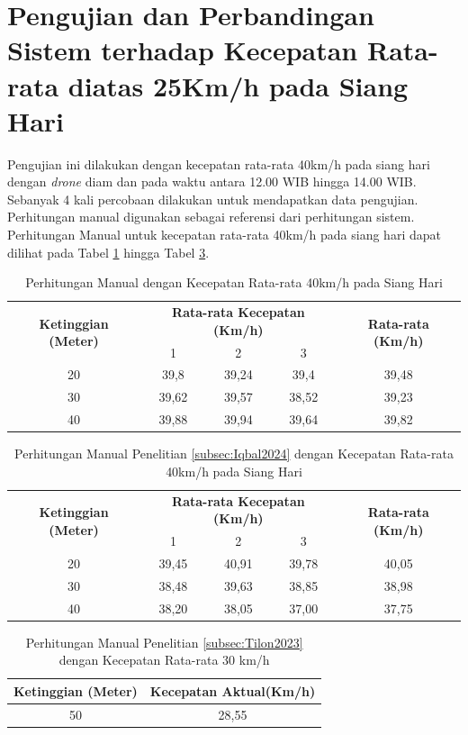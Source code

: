 \section{Pengujian dan Perbandingan Sistem terhadap Kecepatan Rata-rata diatas 25Km/h pada Siang Hari}
Pengujian ini dilakukan dengan kecepatan rata-rata 40km/h pada siang hari dengan \emph{drone} diam dan pada waktu antara 12.00 WIB hingga 14.00 WIB. Sebanyak 4 kali percobaan dilakukan untuk mendapatkan data pengujian. Perhitungan manual digunakan sebagai referensi dari perhitungan sistem. Perhitungan Manual untuk kecepatan rata-rata 40km/h pada siang hari dapat dilihat pada Tabel \ref{table:40km/h-siang-manual} hingga Tabel \ref{table:30kmh-manual-Tilon}.

\begin{table}[H]
	\caption{Perhitungan Manual dengan Kecepatan Rata-rata 40km/h pada Siang Hari}
    \label{table:40km/h-siang-manual}
	\centering
	\begin{tabular}{|c|c|c|c|c|}
		\hline
		\multirow{2}{*}{\textbf{Ketinggian (Meter)}} & \multicolumn{3}{c|}{\textbf{Rata-rata Kecepatan (Km/h)}} & \multirow{2}{*}{\textbf{Rata-rata (Km/h)}} \\ \cline{2-4}
		& 1 & 2 & 3 & \\ \hline
		20 & 39,8 & 39,24 & 39,4 & 39,48 \\
		30 & 39,62 & 39,57 & 38,52 & 39,23 \\
		40 & 39,88 & 39,94 & 39,64 & 39,82 \\ \hline
	\end{tabular}
\end{table}
\vspace{-10pt}
\begin{table}[H]
	\caption{Perhitungan Manual Penelitian \ref{subsec:Iqbal2024} dengan Kecepatan Rata-rata 40km/h pada Siang Hari}
    \label{table:40km/h-siang-manual-iqbal}
	\centering
	\begin{tabular}{|c|c|c|c|c|}
		\hline
		\multirow{2}{*}{\textbf{Ketinggian (Meter)}} & \multicolumn{3}{c|}{\textbf{Rata-rata Kecepatan (Km/h)}} & \multirow{2}{*}{\textbf{Rata-rata (Km/h)}} \\ \cline{2-4}
		& 1 & 2 & 3 & \\ \hline
		20 & 39,45 & 40,91 & 39,78 & 40,05 \\
		30 & 38,48 & 39,63 & 38,85 & 38,98 \\
		40 & 38,20 & 38,05 & 37,00 & 37,75 \\ \hline
	\end{tabular}
\end{table}
\vspace{-10pt}
\begin{table}[H]
	\caption{Perhitungan Manual Penelitian \ref{subsec:Tilon2023} dengan Kecepatan Rata-rata 30 km/h}
    \label{table:30kmh-manual-Tilon}
	\centering
	\begin{tabular}{|c|c|}
		\hline
		\textbf{Ketinggian (Meter)} & \textbf{Kecepatan Aktual(Km/h)}\\ \hline
		50 & 28,55 \\ \hline
	\end{tabular}
\end{table}

